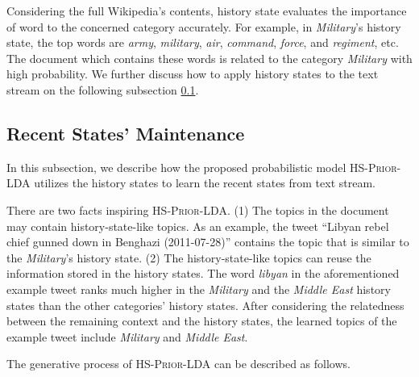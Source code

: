 \documentclass{article}
\begin{document}
Considering the full Wikipedia's contents, history state evaluates the importance of word to the concerned category accurately. 
For example, in \textit{Military}'s history state, the top  words are \textit{army}, \textit{military}, \textit{air}, \textit{command}, \textit{force}, and \textit{regiment}, etc. 
The document which contains these words is related to the category \textit{Military} with high probability. 
We further discuss how to apply history states to the text stream on the following subsection \ref{subsec:rs_initialization}.

\subsection{Recent States' Maintenance}
\label{subsec:rs_initialization}
In this subsection, we describe how the proposed probabilistic model \textsc{HS-Prior-LDA} utilizes the history states to learn the recent states from text stream.

There are two facts inspiring \textsc{HS-Prior-LDA}. 
(1) The topics in the document may contain history-state-like topics. 
As an example, the tweet ``Libyan rebel chief gunned down in Benghazi (2011-07-28)'' contains the topic that is similar to the \textit{Military}'s history state.
(2) The history-state-like topics can reuse the information  stored in the history states.
The word \textit{libyan} in the aforementioned example tweet ranks much higher in the \textit{Military} and the \textit{Middle East} history states than the other categories' history states.
After considering the relatedness between the remaining context and the history states, the learned topics of the example tweet include \textit{Military} and \textit{Middle East}. 

The generative process of \textsc{HS-Prior-LDA} can be described as follows.
\end{document}
